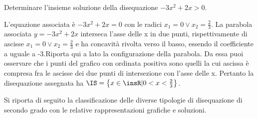 \begin{esempio}
Determinare l'insieme soluzione della disequazione \(-3x^2+2x>0\).

L'equazione associata è \(-3x^2+2x=0\) con le radici \(x_1=0\vee x_2=\frac 2 3\). 
La parabola associata \(y=-3x^2+2x\) interseca l'asse delle x in due punti, 
rispettivamente di ascisse \(x_1=0\vee x_2=\frac 2 3\) e ha concavità rivolta 
verso il basso, essendo il coefficiente a uguale a -3.Riporta qui a lato la 
configurazione della parabola.
Da essa puoi osservare che i punti del grafico con ordinata positiva sono 
quelli 
la cui ascissa è compresa fra le ascisse dei due punti di intersezione con 
l'asse delle x.
Pertanto la disequazione assegnata ha \(\IS=\left\{x\in \insR | 0<x<\frac 2 
3\right\}\).
\end{esempio}


Si riporta di seguito la classificazione delle diverse 
tipologie di disequazione di secondo grado con le relative rappresentazioni 
grafiche e soluzioni.

% 

\begin{inaccessibleblock}
\end{inaccessibleblock}

{\centering

\vspace{12pt}

\vspace{12pt}

\vspace{12pt}

\vspace{12pt}

\vspace{12pt}

}


